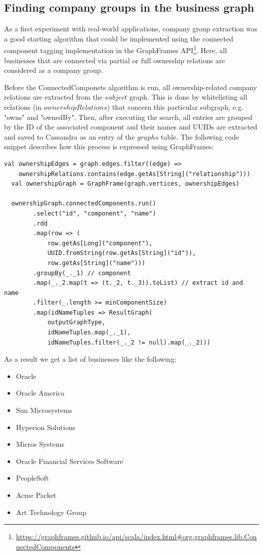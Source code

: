 \documentclass[
  a4paper,     %
  titlepage,   %
  oneside,     %
  parskip      %
]{scrartcl}          %
\begin{document}
  \subsection{Finding company groups in the business graph}
  \label{sec:company_groups}
  As a first experiment with real-world applications, company group extraction
  was a good starting algorithm that could be implemented using the connected component
  tagging implementation in the GraphFrames
  API\footnote{\url{https://graphframes.github.io/api/scala/index.html\#org.graphframes.lib.ConnectedComponents}}.
  Here, all businesses that are connected via partial or full ownership
  relations are considered as a company group.

  Before the ConnectedComponets algorithm is run, all ownership-related company
  relations are extracted from the $subject$ graph. This is done by whitelisting
  all relations (in $ownershipRelations$) that concern this particular subgraph,
  e.g. "owns" and "ownedBy".
  Then, after executing the search, all entries are grouped by the ID of the
  associated component and their names and UUIDs are extracted and saved to Cassandra
  as an entry of the $graphs$ table. The following code snippet describes how
  this process is expressed using GraphFrames:

  \begin{lstlisting}[style=scalaStyle,caption=Company Group Extraction]
  val ownershipEdges = graph.edges.filter((edge) =>
    ownershipRelations.contains(edge.getAs[String]("relationship")))
  val ownershipGraph = GraphFrame(graph.vertices, ownershipEdges)

  ownershipGraph.connectedComponents.run()
		.select("id", "component", "name")
		.rdd
		.map(row => (
			row.getAs[Long]("component"),
			UUID.fromString(row.getAs[String]("id")),
			row.getAs[String]("name")))
		.groupBy(_._1) // component
		.map(_._2.map(t => (t._2, t._3)).toList) // extract id and name
		.filter(_.length >= minComponentSize)
		.map(idNameTuples => ResultGraph(
			outputGraphType,
			idNameTuples.map(_._1),
			idNameTuples.filter(_._2 != null).map(_._2)))
  \end{lstlisting}

  As a result we get a list of businesses like the following:
  \begin{itemize}[noitemsep]
  \item Oracle
  \item Oracle America
  \item Sun Microsystems
  \item Hyperion Solutions
  \item Micros Systems
  \item Oracle Financial Services Software
  \item PeopleSoft
  \item Acme Packet
  \item Art Technology Group
  \end{itemize}
\end{document}
